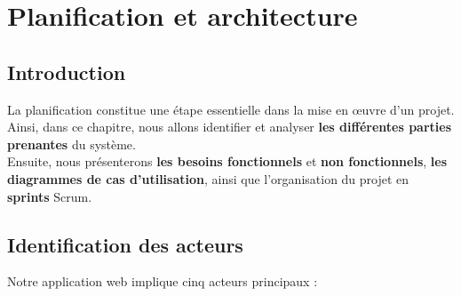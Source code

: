 \chapter{Planification et architecture}
\label{Chapitre_2}
\section*{Introduction}

La planification constitue une étape essentielle dans la mise en œuvre d'un projet. Ainsi, dans ce chapitre, nous allons identifier et analyser \textbf{les différentes parties prenantes} du système. \\Ensuite, nous présenterons \textbf{les besoins fonctionnels} et \textbf{non fonctionnels}, \textbf{les diagrammes de cas d'utilisation}, ainsi que l'organisation du projet en \textbf{sprints} Scrum.
\section{Identification des acteurs}
\label{section2.1}

Notre application web implique cinq acteurs principaux :

